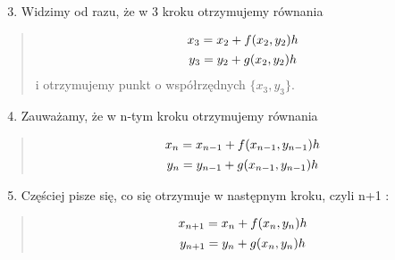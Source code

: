 \documentclass[a4paper,12pt,polish]{sphinxmanual}
\begin{document}
\begin{enumerate}
\setcounter{enumi}{2}
\item {} 
Widzimy od razu, że w 3 kroku otrzymujemy równania

\end{enumerate}
\begin{quote}
\label{ch1/chI021:equation-eqn46}\begin{gather}
\begin{split}x_3 =  x_2 + f(x_2, y_2) h\end{split}\label{ch1/chI021-eqn46}\\\begin{split}y_3 =  y_2 + g(x_2, y_2) h\end{split}\notag
\end{gather}
i otrzymujemy punkt o współrzędnych $\{x_3, y_3\}$.
\end{quote}
\begin{enumerate}
\setcounter{enumi}{3}
\item {} 
Zauważamy, że w n-tym kroku otrzymujemy równania

\end{enumerate}
\begin{quote}
\label{ch1/chI021:equation-eqn48}\begin{gather}
\begin{split}x_n =  x_{n-1} + f(x_{n-1}, y_{n-1}) h\end{split}\label{ch1/chI021-eqn48}\\\begin{split}y_n =  y_{n-1} + g(x_{n-1}, y_{n-1}) h\end{split}\notag
\end{gather}\end{quote}
\begin{enumerate}
\setcounter{enumi}{4}
\item {} 
Częściej pisze się, co się otrzymuje w następnym kroku, czyli n+1 :

\end{enumerate}
\begin{quote}
\label{ch1/chI021:equation-eqn50}\begin{gather}
\begin{split}x_{n+1} =  x_n + f(x_n, y_n) h\end{split}\label{ch1/chI021-eqn50}\\\begin{split}y_{n+1} =  y_n + g(x_n, y_n) h\end{split}\notag
\end{gather}\end{quote}
\end{document}
